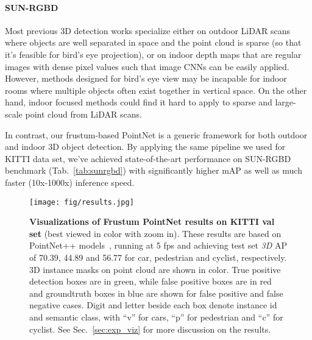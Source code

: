 \documentclass[10pt,twocolumn,letterpaper]{article}
\begin{document}
\paragraph{SUN-RGBD} Most previous 3D detection works specialize either on outdoor LiDAR scans where objects are well separated in space and the point cloud is sparse (so that it's feasible for bird's eye projection), or on indoor depth maps that are regular images with dense pixel values such that image CNNs can be easily applied. However, methods designed for bird's eye view may be incapable for indoor rooms where multiple objects often exist together in vertical space. On the other hand, indoor focused methods could find it hard to apply to sparse and large-scale point cloud from LiDAR scans.

In contrast, our frustum-based PointNet is a generic framework for both outdoor and indoor 3D object detection. By applying the same pipeline we used for KITTI data set, we've achieved state-of-the-art performance on SUN-RGBD benchmark (Tab.~\ref{tab:sunrgbd}) with significantly higher mAP as well as much faster (10x-1000x) inference speed.






\begin{figure*}[t!]
    \centering
    \texttt{[image: fig/results.jpg]}
    \caption{\textbf{Visualizations of Frustum PointNet results on KITTI val set}  (best viewed in color with zoom in). These results are based on PointNet++ models~\cite{qi2017pointnetplusplus}, running at 5 fps and achieving test set \emph{3D} AP of 70.39, 44.89 and 56.77 for car, pedestrian and cyclist, respectively. 3D instance masks on point cloud are shown in color. True positive detection boxes are in green, while false positive boxes are in red and groundtruth boxes in blue are shown for false positive and false negative cases. Digit and letter beside each box denote instance id and semantic class, with ``v'' for cars, ``p'' for pedestrian and ``c'' for cyclist. See Sec.~\ref{sec:exp_viz} for more discussion on the results.}
    \label{fig:results}
\end{figure*}
\end{document}
